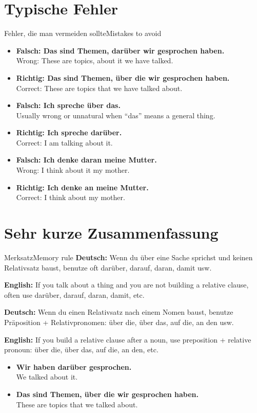 \documentclass[a4paper,11pt]{article}
\newcommand{\GermanText}[1]{\textbf{Deutsch: }#1\par}
\newcommand{\EnglishText}[1]{{\small\color{SoftGray}\textbf{English: }#1\par}}
\newcommand{\ExampleItem}[2]{\item \textbf{#1}\\{\small\color{SoftGray}#2}}
\begin{document}
    
    \section{Typische Fehler}
        
        \begin{grammarentry}{Fehler, die man vermeiden sollte}{Mistakes to avoid}
            \begin{exbox}
                \begin{itemize}
                    \ExampleItem{Falsch: Das sind Themen, darüber wir gesprochen haben.}{Wrong: These are topics, about it we have talked.}
                    \ExampleItem{Richtig: Das sind Themen, über die wir gesprochen haben.}{Correct: These are topics that we have talked about.}
                    \ExampleItem{Falsch: Ich spreche über das.}{Usually wrong or unnatural when ``das'' means a general thing.}
                    \ExampleItem{Richtig: Ich spreche darüber.}{Correct: I am talking about it.}
                    \ExampleItem{Falsch: Ich denke daran meine Mutter.}{Wrong: I think about it my mother.}
                    \ExampleItem{Richtig: Ich denke an meine Mutter.}{Correct: I think about my mother.}
                \end{itemize}
            \end{exbox}
        \end{grammarentry}
    
    
    \section{Sehr kurze Zusammenfassung}
        
        \begin{grammarentry}{Merksatz}{Memory rule}
            \GermanText{Wenn du über eine Sache sprichst und keinen Relativsatz baust, benutze oft darüber, darauf, daran, damit usw.}
            \EnglishText{If you talk about a thing and you are not building a relative clause, often use darüber, darauf, daran, damit, etc.}
            
            \GermanText{Wenn du einen Relativsatz nach einem Nomen baust, benutze Präposition + Relativpronomen: über die, über das, auf die, an den usw.}
            \EnglishText{If you build a relative clause after a noun, use preposition + relative pronoun: über die, über das, auf die, an den, etc.}
            
            \begin{exbox}
                \begin{itemize}
                    \ExampleItem{Wir haben darüber gesprochen.}{We talked about it.}
                    \ExampleItem{Das sind Themen, über die wir gesprochen haben.}{These are topics that we talked about.}
                \end{itemize}
            \end{exbox}
        \end{grammarentry}
\end{document}
